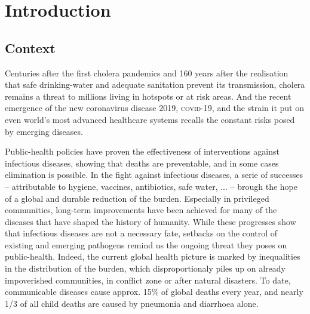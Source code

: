 \chapter*{Introduction} 

 \section{Context}
 Centuries after the first cholera pandemics and 160 years after the realisation that safe drinking-water and adequate sanitation prevent its transmission, cholera remains a threat to millions living in hotspots or at risk areas. And the recent emergence of the new coronavirus disease 2019, \textsc{covid}-19, and the strain it put on even world's most advanced healthcare systems recalls the constant risks posed by emerging diseases. 
 
 Public-health policies have proven the effectiveness of interventions against infectious diseases, showing that deaths are preventable, and in some cases elimination is possible. In the fight against infectious diseases, a serie of successes -- attributable to \eg hygiene, vaccines, antibiotics, safe water, ... -- brough the hope of a global and durable reduction of the burden. Especially in privileged communities, long-term improvements have been achieved for many of the diseases that have shaped the history of humanity. While these progresses show that infectious diseases are not a necessary fate, setbacks on the control of existing and emerging pathogens remind us the ongoing threat they poses on public-health. 
  Indeed, the current global health picture is marked by inequalities in the distribution of the burden, which disproportionaly piles up on already impoverished communities, in conflict zone or after natural disasters. To date, communicable diseases cause approx. 15\% of global deaths every year\cite[-4\baselineskip][tab. 1, excl. non-transmissible neonatal and maternal diseases and nutritional diseases; pre-\textsc{covid}-19 estimates]{Roth:GlobalRegionalNational:2018}, and nearly 1/3 of all child deaths are caused by pneumonia and diarrhoea alone\cite[][\textsc{m} deaths among under 5, every year.]{WHO:EndingPreventableChild:2013}.  
  
